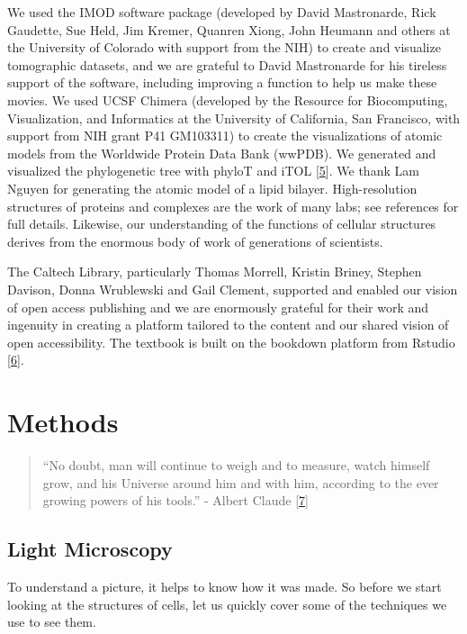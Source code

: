 \documentclass[]{tufte-book}
\begin{document}
We used the IMOD software package (developed by David Mastronarde, Rick Gaudette, Sue Held, Jim Kremer, Quanren Xiong, John Heumann and others at the University of Colorado with support from the NIH) to create and visualize tomographic datasets, and we are grateful to David Mastronarde for his tireless support of the software, including improving a function to help us make these movies. We used UCSF Chimera (developed by the Resource for Biocomputing, Visualization, and Informatics at the University of California, San Francisco, with support from NIH grant P41 GM103311) to create the visualizations of atomic models from the Worldwide Protein Data Bank (wwPDB). We generated and visualized the phylogenetic tree with phyloT and iTOL {[}\protect\hyperlink{ref-letunic2019}{5}{]}. We thank Lam Nguyen for generating the atomic model of a lipid bilayer. High-resolution structures of proteins and complexes are the work of many labs; see references for full details. Likewise, our understanding of the functions of cellular structures derives from the enormous body of work of generations of scientists.

The Caltech Library, particularly Thomas Morrell, Kristin Briney, Stephen Davison, Donna Wrublewski and Gail Clement, supported and enabled our vision of open access publishing and we are enormously grateful for their work and ingenuity in creating a platform tailored to the content and our shared vision of open accessibility. The textbook is built on the bookdown platform from Rstudio {[}\protect\hyperlink{ref-xie2016}{6}{]}.

\hypertarget{methods}{%
\chapter{Methods}\label{methods}}

\begin{quote}
``No doubt, man will continue to weigh and to measure, watch himself grow, and his Universe around him and with him, according to the ever growing powers of his tools.''
- Albert Claude {[}\protect\hyperlink{ref-claude1974}{7}{]}
\end{quote}

\hypertarget{light-microscopy}{%
\section{Light Microscopy}\label{light-microscopy}}

To understand a picture, it helps to know how it was made. So before we start looking at the structures of cells, let us quickly cover some of the techniques we use to see them.
\end{document}
